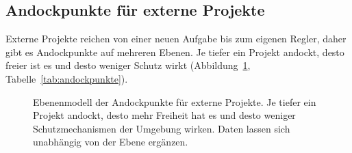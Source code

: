 \subsection{Andockpunkte für externe Projekte}
\label{sec:andockpunkte}
Externe Projekte reichen von einer neuen Aufgabe bis zum eigenen Regler, daher gibt es Andockpunkte auf mehreren Ebenen.
Je tiefer ein Projekt andockt, desto freier ist es und desto weniger Schutz wirkt (Abbildung~\ref{fig:andockpunkte}, Tabelle~\ref{tab:andockpunkte}).

\begin{figure}[!ht]
  \centering
  
  \caption[Ebenenmodell der Andockpunkte]{Ebenenmodell der Andockpunkte für externe Projekte. Je tiefer ein Projekt andockt, desto mehr Freiheit hat es und desto weniger Schutzmechanismen der Umgebung wirken. Daten lassen sich unabhängig von der Ebene ergänzen.}
  \label{fig:andockpunkte}
\end{figure}

